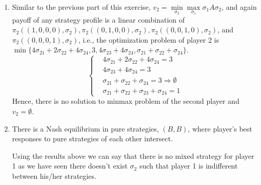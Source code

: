 \documentclass[]{article}
\begin{document}
\begin{enumerate}[label=(\roman*)]
	\item Similar to the previous part of this exercise, $v_2 = \min\limits_{\sigma_2}\max\limits_{\sigma_1}\sigma_1A\sigma_2$, and again payoff of any strategy profile is a linear combination of $\pi_2((1, 0, 0, 0), \sigma_2), \pi_2((0, 1, 0, 0), \sigma_2), \pi_2((0, 0, 1, 0), \sigma_2)$, and $\pi_2((0, 0, 0, 1), \sigma_2)$, i.e., the optimization problem of player 2 is $\min\{4\sigma_{21} + 2\sigma_{22} + 4\sigma_{24}, 3, 4\sigma_{23} + 4\sigma_{24}, \sigma_{21} + \sigma_{22} + \sigma_{24}\}$.
	\begin{equation}
		\begin{cases}
			&4\sigma_{21} + 2\sigma_{22} + 4\sigma_{24} = 3 \\
			&4\sigma_{23} + 4\sigma_{24} = 3 \\
			&\sigma_{21} + \sigma_{22} + \sigma_{24} = 3 \Longrightarrow \emptyset\\
			&\sigma_{21} + \sigma_{22} + \sigma_{23} + \sigma_{24} = 1
		\end{cases}
	\end{equation}
	Hence, there is no solution to minmax problem of the second player and $v_2=\emptyset$.
	
	\item There is a Nash equilibrium in pure strategies, $(B, B)$, where player's best responses to pure strategies of each other intersect. 
	\begin{figure}[h]
		\centering
	\end{figure}

	Using the results above we can say that there is no mixed strategy for player 1 as we have seen there doesn't exist $\sigma_2$ such that player 1 is indifferent between his/her strategies. 
\end{enumerate}
\end{document}
